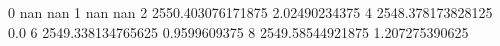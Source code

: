 0 nan nan
1 nan nan
2 2550.403076171875 2.02490234375
4 2548.378173828125 0.0
6 2549.338134765625 0.9599609375
8 2549.58544921875 1.207275390625

